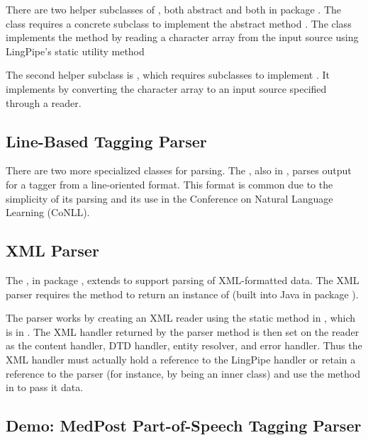 There are two helper subclasses of , both abstract and
both in package .  The class
 requires a concrete subclass to implement the
abstract method .  The 
class implements the  method by reading a
character array from the input source using LingPipe's static utility
method 

The second helper subclass is , which requires
subclasses to implement .  It implements
 by converting the character array to an
input source specified through a reader.

\subsection{Line-Based Tagging Parser}

There are two more specialized classes for parsing.  The
, also in , parses
output for a tagger from a line-oriented format.  This format is
common due to the simplicity of its parsing and its use in the
Conference on Natural Language Learning (CoNLL).  

\subsection{XML Parser} 

The , in package , extends
 to support parsing of XML-formatted data.
The XML parser requires the method  to return an
instance of  (built into Java in package
).  

The parser works by creating an XML reader using the static method
 in , which is in
.  The XML handler returned by the parser
method  is then set on the reader as the content
handler, DTD handler, entity resolver, and error handler.  Thus the
XML handler must actually hold a reference to the LingPipe handler or
retain a reference to the parser (for instance, by being an inner
class) and use the  method in  to pass
it data.


\subsection{Demo: MedPost Part-of-Speech Tagging Parser}


